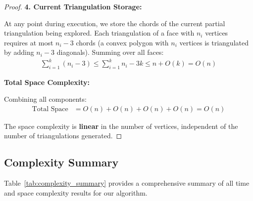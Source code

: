 \documentclass[12pt,a4paper]{article}
\theoremstyle{definition}
\theoremstyle{remark}
\begin{document}
\begin{proof}
\textbf{4. Current Triangulation Storage:}

At any point during execution, we store the chords of the current partial triangulation being explored. Each triangulation of a face with $n_i$ vertices requires at most $n_i - 3$ chords (a convex polygon with $n_i$ vertices is triangulated by adding $n_i - 3$ diagonals). Summing over all faces:
\begin{align*}
\sum_{i=1}^{k} (n_i - 3) \leq \sum_{i=1}^{k} n_i - 3k \leq n + O(k) = O(n)
\end{align*}

\textbf{Total Space Complexity:}

Combining all components:
\begin{align*}
\text{Total Space} &= O(n) + O(n) + O(n) + O(n) = O(n)
\end{align*}

The space complexity is \textbf{linear} in the number of vertices, independent of the number of triangulations generated.
\end{proof}

\subsection{Complexity Summary}

Table~\ref{tab:complexity_summary} provides a comprehensive summary of all time and space complexity results for our algorithm.
\end{document}
